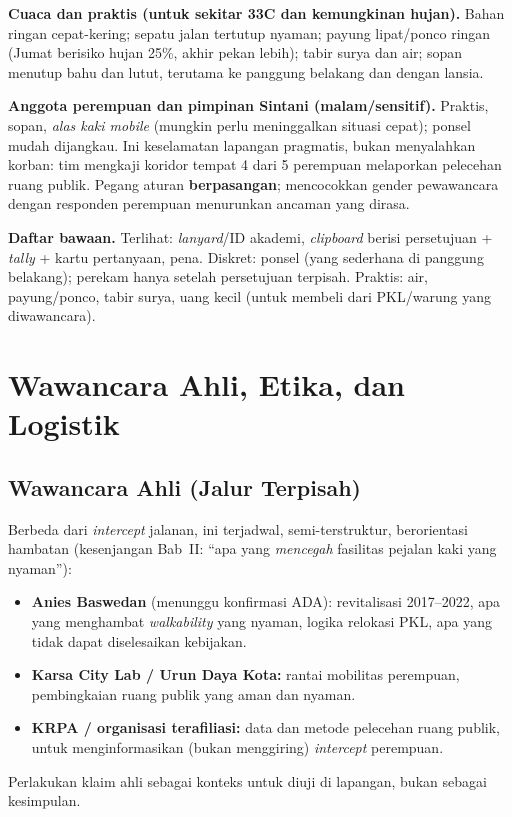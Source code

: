 \documentclass[11pt,a4paper]{report}
\begin{document}
\smallskip\noindent\textbf{Cuaca dan praktis (untuk sekitar 33\textdegree C dan kemungkinan
hujan).} Bahan ringan cepat-kering; sepatu jalan tertutup nyaman; payung lipat/ponco
ringan (Jumat berisiko hujan 25\%, akhir pekan lebih); tabir surya dan air; sopan menutup
bahu dan lutut, terutama ke panggung belakang dan dengan lansia.

\smallskip\noindent\textbf{Anggota perempuan dan pimpinan Sintani (malam/sensitif).}
Praktis, sopan, \emph{alas kaki mobile} (mungkin perlu meninggalkan situasi cepat); ponsel
mudah dijangkau. Ini keselamatan lapangan pragmatis, bukan menyalahkan korban: tim mengkaji
koridor tempat 4 dari 5 perempuan melaporkan pelecehan ruang publik. Pegang aturan
\textbf{berpasangan}; mencocokkan gender pewawancara dengan responden perempuan menurunkan
ancaman yang dirasa.

\smallskip\noindent\textbf{Daftar bawaan.} Terlihat: \emph{lanyard}/ID akademi, \emph{clipboard}
berisi persetujuan + \emph{tally} + kartu pertanyaan, pena. Diskret: ponsel (yang sederhana
di panggung belakang); perekam hanya setelah persetujuan terpisah. Praktis: air,
payung/ponco, tabir surya, uang kecil (untuk membeli dari PKL/warung yang diwawancara).

\chapter{Wawancara Ahli, Etika, dan Logistik}

\section{Wawancara Ahli (Jalur Terpisah)}
Berbeda dari \emph{intercept} jalanan, ini terjadwal, semi-terstruktur, berorientasi
hambatan (kesenjangan Bab~II: ``apa yang \emph{mencegah} fasilitas pejalan kaki yang
nyaman''):
\begin{itemize}
  \item \textbf{Anies Baswedan} (menunggu konfirmasi ADA): revitalisasi 2017--2022, apa
    yang menghambat \emph{walkability} yang nyaman, logika relokasi PKL, apa yang tidak
    dapat diselesaikan kebijakan.
  \item \textbf{Karsa City Lab / Urun Daya Kota:} rantai mobilitas perempuan, pembingkaian
    ruang publik yang aman dan nyaman.
  \item \textbf{KRPA / organisasi terafiliasi:} data dan metode pelecehan ruang publik,
    untuk menginformasikan (bukan menggiring) \emph{intercept} perempuan.
\end{itemize}
Perlakukan klaim ahli sebagai konteks untuk diuji di lapangan, bukan sebagai kesimpulan.
\end{document}
